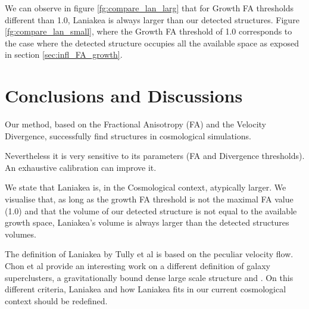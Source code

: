\documentclass[12pt]{article}
\begin{document}
\begin{par}
We can observe in figure \ref{fg:compare_lan_larg}  that for Growth FA thresholds
 different than 1.0, Laniakea is always larger than
  our detected structures. Figure \ref{fg:compare_lan_small}, where the Growth FA threshold
   of 1.0 corresponds to the case where the
    detected structure occupies all the available
     space as exposed in section
      \ref{sec:infl_FA_growth}.
\end{par}



\section{Conclusions and Discussions}
\label{sec:discussions}
\begin{par}
Our method, based on the Fractional Anisotropy (FA) and the Velocity Divergence, successfully find structures in cosmological simulations. \\
\end{par}
\begin{par}
Nevertheless it is very sensitive to its parameters (FA and Divergence thresholds). An exhaustive calibration can improve it.\\
\end{par}
\begin{par}
We state that Laniakea is, in the Cosmological
 context, atypically larger. We visualise that, as
  long as the growth FA threshold is not the
   maximal FA value (1.0) and that the volume of
    our detected structure is not equal to the
     available growth space, Laniakea's volume is
      always larger than the detected structures
       volumes. \\
\end{par}
\begin{par}
The definition of Laniakea by Tully et al
 \cite{tully_laniakea_2014} is based on the
  peculiar velocity flow. Chon et al provide an
   interesting work on a different definition of
    galaxy superclusters, a gravitationally bound
     dense large scale structure
      \cite{chon_characterising_2014} and
       \cite{chon_definition_2015}. On this
        different criteria, Laniakea and how
         Laniakea fits in our current cosmological
          context should be redefined.  \\
\end{par}

\end{document}
